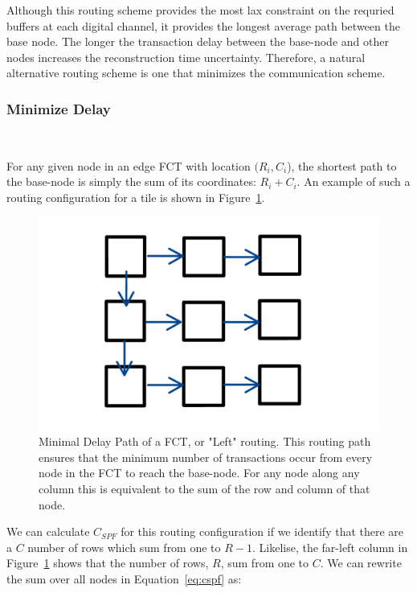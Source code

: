 Although this routing scheme provides the most lax constraint on the requried buffers at each digital channel, it provides the longest average path between the base node.
The longer the transaction delay between the base-node and other nodes increases the reconstruction time uncertainty.
Therefore, a natural alternative routing scheme is one that minimizes the communication scheme.

\subsubsection{Minimize Delay}~\label{sec:min_comm}

For any given node in an edge FCT with location $(R_{i},C_{i}$), the shortest path to the base-node is simply the sum of its coordinates: $R_{i}+C_{i}$.
An example of such a routing configuration for a tile is shown in Figure~\ref{fig:leftroute}.

\begin{figure}[]
\centering
\includegraphics[width=\textwidth]{images/leftroute.pdf}
\caption{Minimal Delay Path of a FCT, or "Left" routing.
This routing path ensures that the minimum number of transactions occur from every node in the FCT to reach the base-node.
For any node along any column this is equivalent to the sum of the row and column of that node.}
\label{fig:leftroute}
\end{figure}

We can calculate $C_{SPF}$ for this routing configuration if we identify that there are a $C$ number of rows which sum from one to $R-1$.
Likelise, the far-left column in Figure~\ref{fig:leftroute} shows that the number of rows, $R$, sum from one to $C$.
We can rewrite the sum over all nodes in Equation~\ref{eq:cspf} as:

